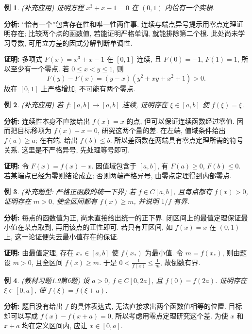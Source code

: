 \documentclass[UTF8,openany]{ctexbook}
\theoremstyle{chinesetextbook}
\newtheorem{example}{例}[section]
\newenvironment{cnproof}{\par\indent\textbf{证明:} \ignorespaces}{\par}
\begin{document}
\begin{example}
(补充应用) 证明方程 $x^3+x-1=0$ 在 $(0,1)$ 内恰有一个实根.
\end{example}
\par\indent\textbf{分析:} “恰有一个”包含存在性和唯一性两件事. 连续与端点异号提示用零点定理证明存在; 比较两个点的函数值, 若能证明严格单调, 就能排除第二个根. 此处尚未学习导数, 可用立方差的因式分解判断单调性.

\begin{cnproof}
多项式 $F(x)=x^3+x-1$ 在 $[0,1]$ 连续, 且 $F(0)=-1$, $F(1)=1$, 所以至少有一个零点. 若 $0\le x<y\le1$, 则
\[
F(y)-F(x)=(y-x)(y^2+xy+x^2+1)>0.
\]
故在 $[0,1]$ 上严格增加, 不可能有两个零点.
\end{cnproof}
\begin{example}
(补充应用) 若 $f:[a,b]\to[a,b]$ 连续, 证明存在 $\xi\in[a,b]$ 使 $f(\xi)=\xi$.
\end{example}
\par\indent\textbf{分析:} 连续性本身不直接给出 $f(x)=x$ 的点, 但可以保证连续函数经过零值. 因而把目标移项为 $f(x)-x=0$, 研究这两个量的差. 在左端, 值域条件给出 $f(a)\ge a$; 在右端, 给出 $f(b)\le b$. 所以差函数在两端具有零点定理所需的符号关系. 这里是不严格异号, 先处理等号即可.

\begin{cnproof}
令 $F(x)=f(x)-x$. 因值域包含于 $[a,b]$, 有 $F(a)\ge0$, $F(b)\le0$. 若某端点已经为零则结论成立; 否则两端严格异号, 由零点定理得到内部零点.
\end{cnproof}

\begin{example}
(补充题型: 严格正函数的统一下界) 若 $f\in C[a,b]$, 且每点都有 $f(x)>0$, 证明存在 $m>0$, 使全区间都有 $f(x)\ge m$, 并说明 $1/f$ 有界.
\end{example}
\par\indent\textbf{分析:} 每点的函数值为正, 尚未直接给出统一的正下界. 闭区间上的最值定理保证最小值在某点取到, 再用该点的正性即可. 若只有开区间, 如 $f(x)=x$ 在 $(0,1)$ 上, 这一论证便失去最小值存在的保证.
\begin{cnproof}
由最值定理, 存在 $x_*\in[a,b]$ 使 $f(x_*)$ 为最小值. 令 $m=f(x_*)$, 则由题设 $m>0$, 且全区间 $f(x)\ge m$. 于是 $\displaystyle0<\frac1{f(x)}\le\frac1m$, 故倒数有界.
\end{cnproof}
\begin{example}
(教材习题1.9第6题) 设 $a>0$, $f\in C[0,2a]$, 且 $f(0)=f(2a)$. 证明存在 $\xi\in[0,a]$, 使 $f(\xi)=f(\xi+a)$.
\end{example}
\par\indent\textbf{分析:} 题目没有给出 $f$ 的具体表达式, 无法直接求出两个函数值相等的位置. 目标却可以写成 $f(x)-f(x+a)=0$, 所以考虑用零点定理研究这个差. 为使 $x$ 和 $x+a$ 均在定义区间内, 应让 $x\in[0,a]$.
\end{document}
